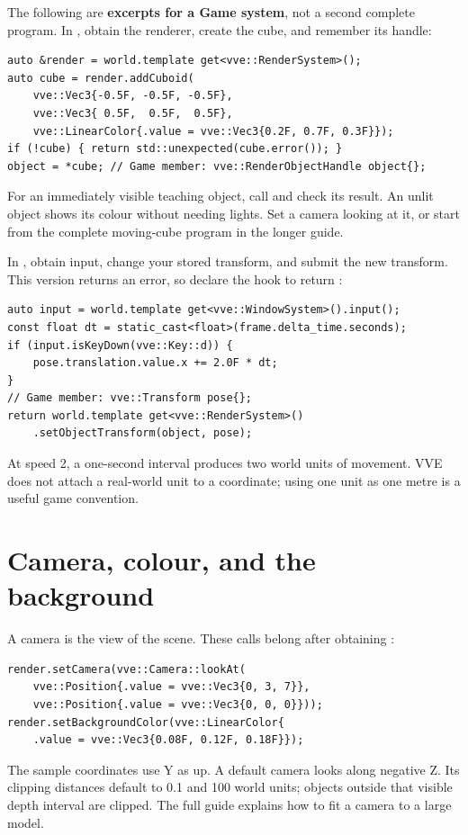 \documentclass[11pt,a4paper]{article}
\begin{document}
The following are \textbf{excerpts for a Game system}, not a second complete program. In , obtain the renderer, create the cube, and remember its handle:
\begin{lstlisting}
auto &render = world.template get<vve::RenderSystem>();
auto cube = render.addCuboid(
    vve::Vec3{-0.5F, -0.5F, -0.5F},
    vve::Vec3{ 0.5F,  0.5F,  0.5F},
    vve::LinearColor{.value = vve::Vec3{0.2F, 0.7F, 0.3F}});
if (!cube) { return std::unexpected(cube.error()); }
object = *cube; // Game member: vve::RenderObjectHandle object{};
\end{lstlisting}
For an immediately visible teaching object, call  and check its result. An unlit object shows its colour without needing lights. Set a camera looking at it, or start from the complete moving-cube program in the longer guide.

In , obtain input, change your stored transform, and submit the new transform. This version returns an error, so declare the hook to return :
\begin{lstlisting}
auto input = world.template get<vve::WindowSystem>().input();
const float dt = static_cast<float>(frame.delta_time.seconds);
if (input.isKeyDown(vve::Key::d)) {
    pose.translation.value.x += 2.0F * dt;
}
// Game member: vve::Transform pose{};
return world.template get<vve::RenderSystem>()
    .setObjectTransform(object, pose);
\end{lstlisting}
At speed 2, a one-second interval produces two world units of movement. VVE does not attach a real-world unit to a coordinate; using one unit as one metre is a useful game convention.

\section{Camera, colour, and the background}
A camera is the view of the scene. These calls belong after obtaining :
\begin{lstlisting}
render.setCamera(vve::Camera::lookAt(
    vve::Position{.value = vve::Vec3{0, 3, 7}},
    vve::Position{.value = vve::Vec3{0, 0, 0}}));
render.setBackgroundColor(vve::LinearColor{
    .value = vve::Vec3{0.08F, 0.12F, 0.18F}});
\end{lstlisting}
The sample coordinates use Y as up. A default camera looks along negative Z. Its clipping distances default to 0.1 and 100 world units; objects outside that visible depth interval are clipped. The full guide explains how to fit a camera to a large model.
\end{document}
